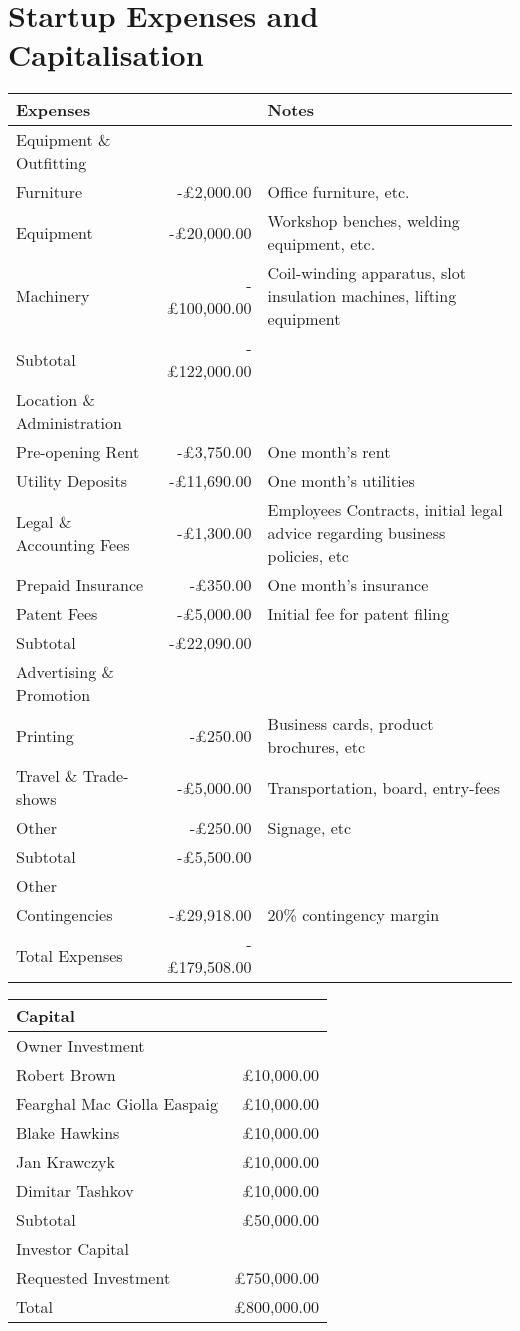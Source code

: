 \documentclass[a4paper,11pt]{article}
\begin{document}
\section{Startup Expenses and Capitalisation}
\begin{tabular}{l r | p{5cm}}
	Expenses & & Notes \\
	\hline
	Equipment \& Outfitting & \\
	Furniture & -£2,000.00 & Office furniture, etc. \\
	Equipment & -£20,000.00 & Workshop benches, welding equipment, etc. \\
	Machinery & -£100,000.00 & Coil-winding apparatus, slot insulation machines, lifting equipment \\
	Subtotal & -£122,000.00 & \\
	\hline
	Location \& Administration & \\
	Pre-opening Rent & -£3,750.00 & One month's rent \\
	Utility Deposits & -£11,690.00 & One month's utilities \\
	Legal \& Accounting Fees & -£1,300.00 & Employees Contracts, initial legal advice regarding business policies, etc \\
	Prepaid Insurance & -£350.00 & One month's insurance \\
	Patent Fees & -£5,000.00 & Initial fee for patent filing \\
	Subtotal & -£22,090.00 & \\
	\hline
	Advertising \& Promotion & \\
	Printing & -£250.00 & Business cards, product brochures, etc \\
	Travel \& Trade-shows & -£5,000.00 & Transportation, board, entry-fees \\
	Other & -£250.00 & Signage, etc \\
	Subtotal & -£5,500.00 & \\
	\hline
	Other & \\
	Contingencies & -£29,918.00 & 20\% contingency margin \\
	Total Expenses & -£179,508.00 & \\
\end{tabular}

\vspace{1cm}

\begin{tabular}{l r}
	Capital & \\
	\hline
	Owner Investment & \\
	Robert Brown & £10,000.00 \\
	Fearghal Mac Giolla Easpaig & £10,000.00 \\
	Blake Hawkins & £10,000.00 \\
	Jan Krawczyk & £10,000.00 \\
	Dimitar Tashkov & £10,000.00 \\
	Subtotal & £50,000.00 \\
	\hline
	Investor Capital & \\
	Requested Investment & £750,000.00 \\
	Total & £800,000.00 \\
\end{tabular}
\end{document}
